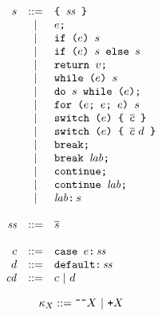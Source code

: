 \documentclass{article}
\newcommand{\seq}[1]{\overline{{#1}}}
\newcommand{\mathjs}[1]{\mbox{\texttt{{#1}}}}
\newcommand{\return}[1]{\mathjs{return }{#1}\mathjs{;}}
\newcommand{\while}[2]{\mathjs{while (}{#1}\mathjs{) }{#2}}
\newcommand{\dowhile}[2]{\mathjs{do }{#1}\mathjs{ while (}{#2}\mathjs{);}}
\newcommand{\for}[4]{\mathjs{for (}{#1}\mathjs{; }{#2}\mathjs{; }{#3}\mathjs{) }{#4}}
\newcommand{\switch}[2]{\mathjs{switch (}{#1}\mathjs{) \{ }{#2}\mathjs{ \}}}
\newcommand{\brk}{\mathjs{break;}}
\newcommand{\brkl}[1]{\mathjs{break }{#1}\mathjs{;}}
\newcommand{\cont}{\mathjs{continue;}}
\newcommand{\contl}[1]{\mathjs{continue }{#1}\mathjs{;}}
\newcommand{\lab}[2]{{#1}\mathjs{:}\,{#2}}
\newcommand{\ifthen}[2]{\mathjs{if (}{#1}\mathjs{) }{#2}}
\newcommand{\ifthenelse}[3]{\mathjs{if (}{#1}\mathjs{) }{#2}\mathjs{ else }{#3}}
\newcommand{\block}[1]{\mathjs{\{ }{#1}\mathjs{ \}}}
\newcommand{\getprop}[2]{{#1}\mathjs{[}{#2}\mathjs{]}}
\newcommand{\longlong}[2]{\mathjs{[}{#1},{#2}\mathjs{]}}
\newcommand{\toint}[1]{{#1}\mathjs{ | 0}}
\newcommand{\touint}[1]{{#1}\mathjs{ >>> 0}}
\newcommand{\tobits}[1]{\mathjs{\~{}\~{}}{#1}}
\newcommand{\tofloat}[1]{\mathjs{+}{#1}}
\begin{document}
\[
\begin{array}{rcl}
s & ::= & \block{\mathit{ss}} \\
  &  |  & e\mathjs{;} \\
  &  |  & \ifthen{e}{s} \\
  &  |  & \ifthenelse{e}{s}{s} \\
  &  |  & \return{v} \\
  &  |  & \while{e}{s} \\
  &  |  & \dowhile{s}{e} \\
  &  |  & \for{e}{e}{e}{s} \\
  &  |  & \switch{e}{\seq{c}} \\
  &  |  & \switch{e}{\seq{c}\ d} \\
  &  |  & \brk \\
  &  |  & \brkl{\mathit{lab}} \\
  &  |  & \cont \\
  &  |  & \contl{\mathit{lab}} \\
  &  |  & \lab{\mathit{lab}}{s} \\
\\
\mathit{ss} & ::= & \seq{s} \\
\\
c & ::= & \mathjs{case }e\mathjs{:}\,\mathit{ss} \\
d & ::= & \mathjs{default:}\,\mathit{ss} \\
\mathit{cd} & ::= & c ~|~ d \\
\end{array}
\]

\[
\kappa_X ::= \tobits{X} ~|~ \tofloat{X}
\]

\end{document}
